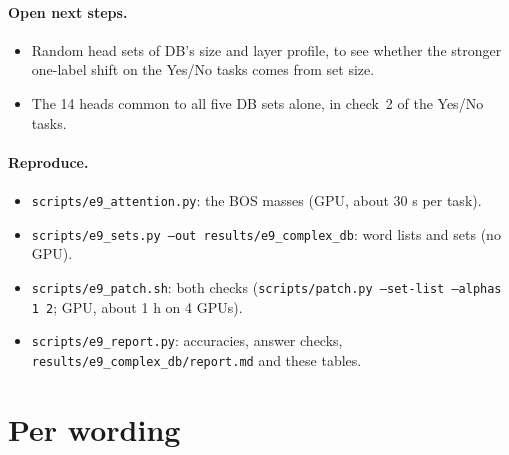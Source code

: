 \documentclass[10pt,a4paper]{article}
\begin{document}
\paragraph{Open next steps.}
\begin{itemize}
\item Random head sets of DB's size and layer profile, to see whether the stronger one-label shift on the Yes/No tasks comes from set size.
\item The 14 heads common to all five DB sets alone, in check~2 of the Yes/No tasks.
\end{itemize}

\paragraph{Reproduce.}
\begin{itemize}
\item \texttt{scripts/e9\_attention.py}: the BOS masses (GPU, about 30 s per task).
\item \texttt{scripts/e9\_sets.py --out results/e9\_complex\_db}: word lists and sets (no GPU).
\item \texttt{scripts/e9\_patch.sh}: both checks (\texttt{scripts/patch.py --set-list --alphas 1 2}; GPU, about 1 h on 4 GPUs).
\item \texttt{scripts/e9\_report.py}: accuracies, answer checks, \texttt{results/e9\_complex\_db/report.md} and these tables.
\end{itemize}

\appendix
\section{Per wording}

\begin{table}[H]\centering\small

\caption{DB, task accuracy under each rule wording's mean.}
\label{tab:wordings}
\end{table}
\end{document}
